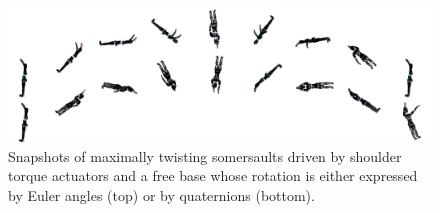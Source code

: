 \begin{figure}[t!]
\centering
\includegraphics[width=\textwidth]{figures/Both_Bioptim_MaxVrille.png}
\caption{Snapshots of maximally twisting somersaults driven by shoulder torque actuators and a free base whose rotation is either expressed by Euler angles (top) or by quaternions (bottom).}
\label{fig:snapshots_quaternion_base_twisting_somersault}
\end{figure}















